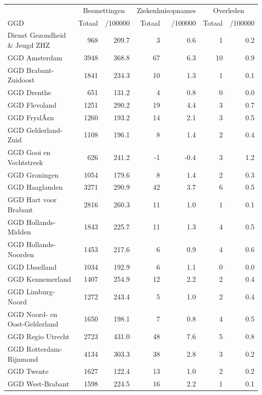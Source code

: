 \documentclass[
  english,
  man,floatsintext]{apa6}
\begin{document}
\begin{table}
\centering\begingroup\fontsize{10}{12}\selectfont

\begin{threeparttable}
\begin{tabular}{lrrrrrr}
\toprule
\multicolumn{1}{c}{ } & \multicolumn{2}{c}{Besmettingen} & \multicolumn{2}{c}{Ziekenhuisopnames} & \multicolumn{2}{c}{Overleden} \\
\cmidrule(l{3pt}r{3pt}){2-3} \cmidrule(l{3pt}r{3pt}){4-5} \cmidrule(l{3pt}r{3pt}){6-7}
GGD & Totaal & /100000 & Totaal & /100000 & Totaal & /100000\\
\midrule
Dienst Gezondheid \& Jeugd ZHZ & 968 & 209.7 & 3 & 0.6 & 1 & 0.2\\
GGD Amsterdam & 3948 & 368.8 & 67 & 6.3 & 10 & 0.9\\
GGD Brabant-Zuidoost & 1841 & 234.3 & 10 & 1.3 & 1 & 0.1\\
GGD Drenthe & 651 & 131.2 & 4 & 0.8 & 0 & 0.0\\
GGD Flevoland & 1251 & 290.2 & 19 & 4.4 & 3 & 0.7\\
GGD FryslÃ¢n & 1260 & 193.2 & 14 & 2.1 & 3 & 0.5\\
GGD Gelderland-Zuid & 1108 & 196.1 & 8 & 1.4 & 2 & 0.4\\
GGD Gooi en Vechtstreek & 626 & 241.2 & -1 & -0.4 & 3 & 1.2\\
GGD Groningen & 1054 & 179.6 & 8 & 1.4 & 2 & 0.3\\
GGD Haaglanden & 3271 & 290.9 & 42 & 3.7 & 6 & 0.5\\
GGD Hart voor Brabant & 2816 & 260.3 & 11 & 1.0 & 1 & 0.1\\
GGD Hollands-Midden & 1843 & 225.7 & 11 & 1.3 & 4 & 0.5\\
GGD Hollands-Noorden & 1453 & 217.6 & 6 & 0.9 & 4 & 0.6\\
GGD IJsselland & 1034 & 192.9 & 6 & 1.1 & 0 & 0.0\\
GGD Kennemerland & 1407 & 254.9 & 12 & 2.2 & 2 & 0.4\\
GGD Limburg-Noord & 1272 & 243.4 & 5 & 1.0 & 2 & 0.4\\
GGD Noord- en Oost-Gelderland & 1650 & 198.1 & 7 & 0.8 & 4 & 0.5\\
GGD Regio Utrecht & 2723 & 431.0 & 48 & 7.6 & 5 & 0.8\\
GGD Rotterdam-Rijnmond & 4134 & 303.3 & 38 & 2.8 & 3 & 0.2\\
GGD Twente & 1627 & 122.4 & 13 & 1.0 & 2 & 0.2\\
GGD West-Brabant & 1598 & 224.5 & 16 & 2.2 & 1 & 0.1\\

\end{tabular}
\end{threeparttable}
\end{table}
\end{document}
